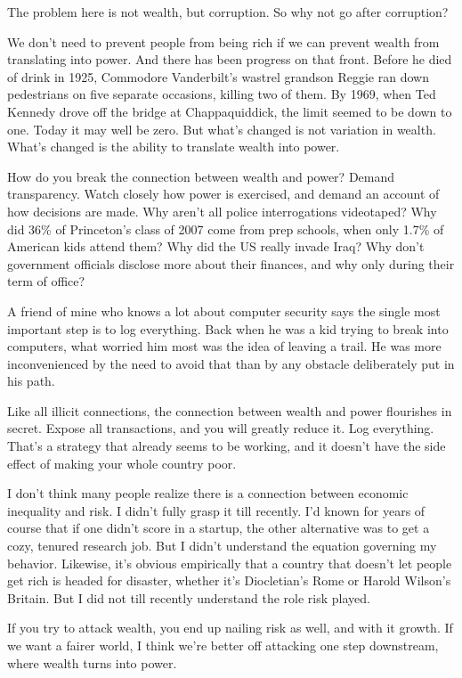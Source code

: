 The problem here is not wealth, but corruption. So why not go after
corruption?

We don't need to prevent people from being rich if we can prevent wealth
from translating into power. And there has been progress on that front.
Before he died of drink in 1925, Commodore Vanderbilt's wastrel grandson
Reggie ran down pedestrians on five separate occasions, killing two of
them. By 1969, when Ted Kennedy drove off the bridge at Chappaquiddick,
the limit seemed to be down to one. Today it may well be zero. But
what's changed is not variation in wealth. What's changed is the ability
to translate wealth into power.

How do you break the connection between wealth and power? Demand
transparency. Watch closely how power is exercised, and demand an
account of how decisions are made. Why aren't all police interrogations
videotaped? Why did 36\% of Princeton's class of 2007 come from prep
schools, when only 1.7\% of American kids attend them? Why did the US
really invade Iraq? Why don't government officials disclose more about
their finances, and why only during their term of office?

A friend of mine who knows a lot about computer security says the single
most important step is to log everything. Back when he was a kid trying
to break into computers, what worried him most was the idea of leaving a
trail. He was more inconvenienced by the need to avoid that than by any
obstacle deliberately put in his path.

Like all illicit connections, the connection between wealth and power
flourishes in secret. Expose all transactions, and you will greatly
reduce it. Log everything. That's a strategy that already seems to be
working, and it doesn't have the side effect of making your whole
country poor.

I don't think many people realize there is a connection between economic
inequality and risk. I didn't fully grasp it till recently. I'd known
for years of course that if one didn't score in a startup, the other
alternative was to get a cozy, tenured research job. But I didn't
understand the equation governing my behavior. Likewise, it's obvious
empirically that a country that doesn't let people get rich is headed
for disaster, whether it's Diocletian's Rome or Harold Wilson's Britain.
But I did not till recently understand the role risk played.

If you try to attack wealth, you end up nailing risk as well, and with
it growth. If we want a fairer world, I think we're better off attacking
one step downstream, where wealth turns into power.

